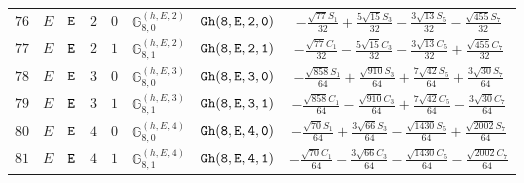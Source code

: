 \documentclass[fleqn,8pt]{jsarticle}
\begin{document}
\begin{table}[ht!]
\begin{center}
\begin{tabular}{cccccccc}
$ 76 $ & $ E $ & $ {\tt E} $ & $ 2 $ & $ 0 $ & $ \mathbb{G}_{8,0}^{(h,E,2)} $ & $ {\tt Gh(8,E,2,0)} $ & $ - \frac{\sqrt{77} S_{1}}{32} + \frac{5 \sqrt{15} S_{3}}{32} - \frac{3 \sqrt{13} S_{5}}{32} - \frac{\sqrt{455} S_{7}}{32} $ \\
$ 77 $ & $ E $ & $ {\tt E} $ & $ 2 $ & $ 1 $ & $ \mathbb{G}_{8,1}^{(h,E,2)} $ & $ {\tt Gh(8,E,2,1)} $ & $ - \frac{\sqrt{77} C_{1}}{32} - \frac{5 \sqrt{15} C_{3}}{32} - \frac{3 \sqrt{13} C_{5}}{32} + \frac{\sqrt{455} C_{7}}{32} $ \\
$ 78 $ & $ E $ & $ {\tt E} $ & $ 3 $ & $ 0 $ & $ \mathbb{G}_{8,0}^{(h,E,3)} $ & $ {\tt Gh(8,E,3,0)} $ & $ - \frac{\sqrt{858} S_{1}}{64} + \frac{\sqrt{910} S_{3}}{64} + \frac{7 \sqrt{42} S_{5}}{64} + \frac{3 \sqrt{30} S_{7}}{64} $ \\
$ 79 $ & $ E $ & $ {\tt E} $ & $ 3 $ & $ 1 $ & $ \mathbb{G}_{8,1}^{(h,E,3)} $ & $ {\tt Gh(8,E,3,1)} $ & $ - \frac{\sqrt{858} C_{1}}{64} - \frac{\sqrt{910} C_{3}}{64} + \frac{7 \sqrt{42} C_{5}}{64} - \frac{3 \sqrt{30} C_{7}}{64} $ \\
$ 80 $ & $ E $ & $ {\tt E} $ & $ 4 $ & $ 0 $ & $ \mathbb{G}_{8,0}^{(h,E,4)} $ & $ {\tt Gh(8,E,4,0)} $ & $ - \frac{\sqrt{70} S_{1}}{64} + \frac{3 \sqrt{66} S_{3}}{64} - \frac{\sqrt{1430} S_{5}}{64} + \frac{\sqrt{2002} S_{7}}{64} $ \\
$ 81 $ & $ E $ & $ {\tt E} $ & $ 4 $ & $ 1 $ & $ \mathbb{G}_{8,1}^{(h,E,4)} $ & $ {\tt Gh(8,E,4,1)} $ & $ - \frac{\sqrt{70} C_{1}}{64} - \frac{3 \sqrt{66} C_{3}}{64} - \frac{\sqrt{1430} C_{5}}{64} - \frac{\sqrt{2002} C_{7}}{64} $ \\
 \hline \hline
\end{tabular}
\end{center}
\end{table}
\end{document}

